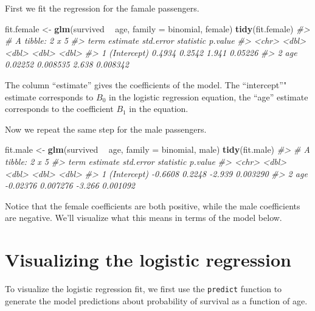 \documentclass[]{book}
\newenvironment{Shaded}{\begin{snugshade}}{\end{snugshade}}
\newcommand{\CommentTok}[1]{\textcolor[rgb]{0.56,0.35,0.01}{\textit{#1}}}
\newcommand{\DataTypeTok}[1]{\textcolor[rgb]{0.13,0.29,0.53}{#1}}
\newcommand{\KeywordTok}[1]{\textcolor[rgb]{0.13,0.29,0.53}{\textbf{#1}}}
\newcommand{\NormalTok}[1]{#1}
\newcommand{\OperatorTok}[1]{\textcolor[rgb]{0.81,0.36,0.00}{\textbf{#1}}}
\newcommand{\StringTok}[1]{\textcolor[rgb]{0.31,0.60,0.02}{#1}}
\theoremstyle{definition}
\theoremstyle{definition}
\theoremstyle{definition}
\theoremstyle{remark}
\begin{document}
First we fit the regression for the famale passengers.

\begin{Shaded}
\begin{Highlighting}[]
\NormalTok{fit.female <-}\StringTok{ }\KeywordTok{glm}\NormalTok{(survived }\OperatorTok{~}\StringTok{ }\NormalTok{age, }\DataTypeTok{family =}\NormalTok{ binomial, female)}
\KeywordTok{tidy}\NormalTok{(fit.female)}
\CommentTok{#> # A tibble: 2 x 5}
\CommentTok{#>   term        estimate std.error statistic  p.value}
\CommentTok{#>   <chr>          <dbl>     <dbl>     <dbl>    <dbl>}
\CommentTok{#> 1 (Intercept)  0.4934   0.2542       1.941 0.05226 }
\CommentTok{#> 2 age          0.02252  0.008535     2.638 0.008342}
\end{Highlighting}
\end{Shaded}

The column ``estimate'' gives the coefficients of the model. The
``intercept''" estimate corresponds to \(B_0\) in the logistic
regression equation, the ``age'' estimate corresponds to the coefficient
\(B_1\) in the equation.

Now we repeat the same step for the male passengers.

\begin{Shaded}
\begin{Highlighting}[]
\NormalTok{fit.male <-}\StringTok{ }\KeywordTok{glm}\NormalTok{(survived }\OperatorTok{~}\StringTok{ }\NormalTok{age, }\DataTypeTok{family =}\NormalTok{ binomial, male)}
\KeywordTok{tidy}\NormalTok{(fit.male)}
\CommentTok{#> # A tibble: 2 x 5}
\CommentTok{#>   term        estimate std.error statistic  p.value}
\CommentTok{#>   <chr>          <dbl>     <dbl>     <dbl>    <dbl>}
\CommentTok{#> 1 (Intercept) -0.6608   0.2248      -2.939 0.003290}
\CommentTok{#> 2 age         -0.02376  0.007276    -3.266 0.001092}
\end{Highlighting}
\end{Shaded}

Notice that the female coefficients are both positive, while the male
coefficients are negative. We'll visualize what this means in terms of
the model below.

\hypertarget{visualizing-the-logistic-regression}{%
\section{Visualizing the logistic
regression}\label{visualizing-the-logistic-regression}}

To visualize the logistic regression fit, we first use the
\texttt{predict} function to generate the model predictions about
probability of survival as a function of age.
\end{document}
